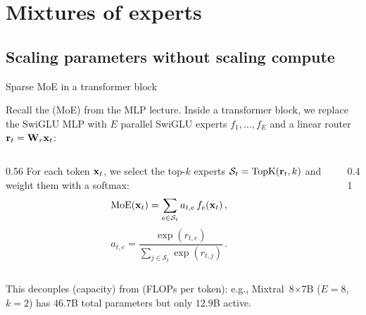 \documentclass[11pt,aspectratio=169]{beamer}
\begin{document}
\section{Mixtures of experts}
\subsection{Scaling parameters without scaling compute}

\begin{frame}{Sparse MoE in a transformer block}
    \setlength{\parskip}{4pt}
    \setlength{\abovedisplayskip}{4pt}\setlength{\belowdisplayskip}{4pt}

    Recall the  (MoE) from the MLP lecture.
    Inside a transformer block, we replace the SwiGLU MLP with $E$ parallel
    SwiGLU experts $f_1,\ldots,f_E$ and a linear router
    $\boldsymbol{\mathbf{r}}_t=\boldsymbol{\mathbf{W}}_r\boldsymbol{\mathbf{x}}_t$:

    \begin{columns}[c,onlytextwidth]
        \begin{column}{0.56\textwidth}
            \setlength{\parskip}{4pt}
            For each token $\boldsymbol{\mathbf{x}}_t$, we select the top-$k$ experts
            $\mathcal{S}_t=\operatorname{TopK}(\boldsymbol{\mathbf{r}}_t, k)$ and weight them
            with a softmax:
            \[
                \operatorname{MoE}(\boldsymbol{\mathbf{x}}_t)=\sum_{e\in\mathcal{S}_t} a_{t,e}\,f_e(\boldsymbol{\mathbf{x}}_t) \,,
            \]
            \[
                a_{t,e}=\frac{\exp(r_{t,e})}{\sum_{j\in\mathcal{S}_t}\exp(r_{t,j})} \,.
            \]
        \end{column}
        \begin{column}{0.41\textwidth}
            \centering
            \scalebox{0.80}{}
        \end{column}
    \end{columns}

    \smallskip
    This decouples  (capacity) from  (FLOPs per token): e.g., Mixtral~8$\times$7B ($E=8$, $k=2$)
    has $46.7$B total parameters but only $12.9$B active.


\end{frame}
\end{document}
